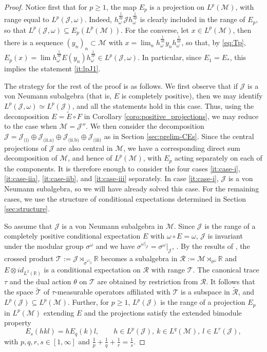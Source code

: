 \documentclass[12pt]{article}
\def\Me{\mathcal M}
\def\Je{\mathcal J}
\theoremstyle{definition}
\theoremstyle{remark}
\begin{document}
\begin{proof} Notice first that for $p\ge 1$, the map $E_p$ is a projection on $L^p(\Me)$,
with range equal to $L^p(\Je,\omega)$.
Indeed,  $h_\omega^{\frac{1}{2p}} \Je h_\omega^{\frac{1}{2p}}$ is
clearly included in the range of $E_p$, so that $L^p(
\Je,\omega)\subseteq E_p(L^p(\Me))$. For the converse, let $x\in L^p(\Me)$, then there is a
sequence $(y_n)_n\subset \Me$ with $x=\lim_n h_\omega^{\frac1{2p}}y_nh_{\omega}^{\frac1{2p}}$, so that, by \eqref{eq:Tp}, 
$E_p(x)=\lim h_{\omega}^{\frac1{2p}} E(y_n) h_{\omega}^{\frac1{2p}} \in L^p(\Je,\omega)$. 
In particular, since $E_1=E_*$, this implies the statement \ref{it:lpJ1}. 

The strategy for the rest of the proof is as follows. 
We first observe that if $\Je$ is a von Neumann subalgebra (that is, $E$ is completely
positive), then we may identify $L^p(\Je,\omega)\simeq L^p(\Je)$, and all the statements hold in this case.
Thus, using the decomposition $E=\tilde E\circ F$ in Corollary \ref{coro:positive_projections}, we may reduce to the case when $\Me=\Je''$.
We then consider the decomposition $\Je=\Je_{\text{(i)}}\oplus\Je_{\text{(ii.a)}}\oplus \Je_{\text{(ii.b)}} \oplus \Je_{\text{(iii)}}$ as in Section \ref{sec:prelim-CEs}.
Since the central projections of $\Je$ are also central in $\Me$, we have a corresponding direct sum decomposition of $\Me$, and hence of $L^p(\Me)$, with $E_p$ acting separately on each of the components. 
It is therefore enough to consider the four cases \ref{it:case-i}, \ref{it:case-iia}, \ref{it:case-iib}, and \ref{it:case-iii} separately.
In case \ref{it:case-i}, $\Je$ is a von Neumann subalgebra, so we will have already solved this case.
For the remaining cases, we use the structure of conditional expectations determined in  Section \ref{sec:structure}. 

So assume that $\Je$ is a von Neumann subalgebra in $\Me$. Since $\Je$ is the range of
a completely positive conditional expectation $E$ with $\omega\circ E=\omega$, $\Je$ is invariant under the
modular group $\sigma^\omega$ and we have $\sigma^{\omega|_\Je}=\sigma^\omega|_\Je$,
\cite{takesaki1972conditional}.
By the results of \cite{junge2003noncommutative}, 
the crossed product $\mathcal T:=\Je\rtimes_{\sigma^{\omega|_\Je}} \mathbb R$
 becomes a subalgebra in $\mathcal R:=\Me\rtimes_{\sigma^\omega}\mathbb R$ and $E\otimes
 id_{L^2(\mathbb R)}$ is a conditional expectation on $\mathcal R$ with range $\mathcal
 T$. The canonical trace $\tau$  and the dual action $\theta$ on $\mathcal T$ are obtained by restriction from $\mathcal R$.
 It follows that the space $\tilde{\mathcal T}$ of $\tau$-measurable operators affiliated
 with
 $\mathcal T$ is a subspace in  $\tilde{\mathcal R}$, and $L^p(\Je)\subseteq
 L^p(\Me)$. Further, for  $p\ge 1$,  $L^p(\Je)$  is the range of a projection $E_p$ in
 $L^p(\Me)$ extending $E$ and the projections  satisfy the extended bimodule property
 \begin{equation}\label{eq:cp_bimodule}
E_s(hkl)=hE_q(k)l,\qquad h\in L^p(\Je),\ k\in L^q(\Me),\ l\in L^r(\Je),
 \end{equation}
with $p,q,r,s\in [1,\infty]$ and $\frac1p+\frac1q+\frac1r=\frac1s$. 


\end{proof}
\end{document}
